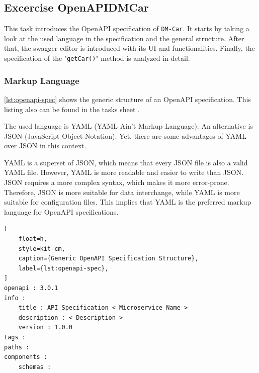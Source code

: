 \subsection{Excercise OpenAPIDMCar}
This task introduces the OpenAPI specification of \texttt{DM-Car}.
It starts by taking a look at the used language in the specification and the general structure.
After that, the swagger editor \cite{SWA-EDI} is introduced with its UI and functionalities.
Finally, the specification of the "\texttt{getCar()}" method is analyzed in detail.

\subsubsection*{Markup Language}
\autoref*{lst:openapi-spec} shows the generic structure of an OpenAPI specification.
This listing also can be found in the tasks sheet \cite{CM-T-DMC}.

The used language is YAML (YAML Ain't Markup Language).
An alternative is JSON (JavaScript Object Notation).
Yet, there are some advantages of YAML over JSON in this context.

YAML is a superset of JSON, which means that every JSON file is also a valid YAML file.
However, YAML is more readable and easier to write than JSON.
JSON requires a more complex syntax, which makes it more error-prone.
Therefore, JSON is more suitable for data interchange, while YAML is more suitable for configuration files.
This implies that YAML is the preferred markup language for OpenAPI specifications.

\begin{lstlisting}[
    float=h,
    style=kit-cm,
    caption={Generic OpenAPI Specification Structure},
    label={lst:openapi-spec},
]
openapi : 3.0.1
info :
    title : API Specification < Microservice Name >
    description : < Description >
    version : 1.0.0
tags :
paths :
components :
    schemas :
\end{lstlisting}

